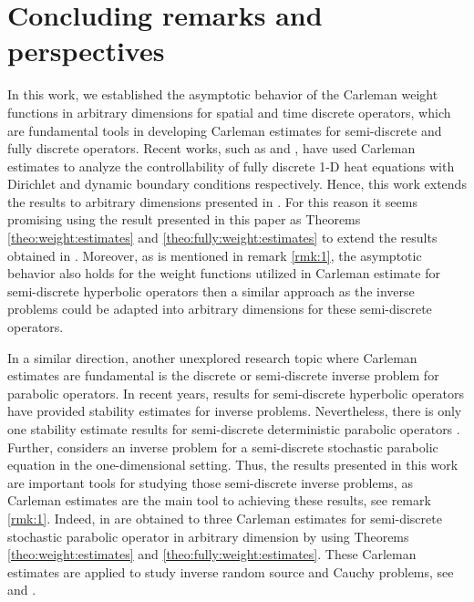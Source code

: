 \documentclass[11pt,oneside,leqno]{amsart}
\numberwithin{equation}{section}
\numberwithin{equation}{section}
\begin{document}
\section{Concluding remarks and perspectives}\label{sec:concluding}
In this work, we established the asymptotic behavior of the Carleman weight functions in arbitrary dimensions for spatial and time discrete operators, which are fundamental tools in developing Carleman estimates for semi-discrete and fully discrete operators. Recent works, such as \cite{GC-HS-2021} and \cite{LMPZ:2023}, have used Carleman estimates to analyze the controllability of fully discrete 1-D heat equations with Dirichlet and dynamic boundary conditions respectively. Hence, this work extends the results to arbitrary dimensions presented in \cite{GC-HS-2021}. For this reason it seems promising using the result presented in this paper as Theorems \ref{theo:weight:estimates} and \ref{theo:fully:weight:estimates} to extend the results obtained in \cite{LMPZ:2023}. Moreover, as is mentioned in remark \ref{rmk:1}, the asymptotic behavior also holds for the weight functions utilized in Carleman estimate for semi-discrete hyperbolic operators then a similar approach as the inverse problems could be adapted into arbitrary dimensions for these semi-discrete operators.
\par In a similar direction, another unexplored research topic where Carleman estimates are fundamental is the discrete or semi-discrete inverse problem for parabolic operators. In recent years, results for semi-discrete hyperbolic operators \cite{BEO-2015,BE-2013} have provided stability estimates for inverse problems. Nevertheless, there is only one stability estimate results for semi-discrete deterministic parabolic operators \cite{LLRP:2025}. Further, \cite{Wu_2024} considers an inverse problem for a semi-discrete stochastic parabolic equation in the one-dimensional setting. Thus, the results presented in this work are important tools for studying those semi-discrete inverse problems, as Carleman estimates are the main tool to achieving these results, see remark \ref{rmk:1}. Indeed, in \cite{LPP:2026b} are obtained to three Carleman estimates for semi-discrete stochastic parabolic operator in arbitrary dimension by using Theorems \ref{theo:weight:estimates} and \ref{theo:fully:weight:estimates}. These Carleman estimates are applied to study inverse random source and Cauchy problems, see \cite[Theorem 1.1]{LPP:2026b} and \cite[Theorem 1.3]{LPP:2026b}.
\end{document}
